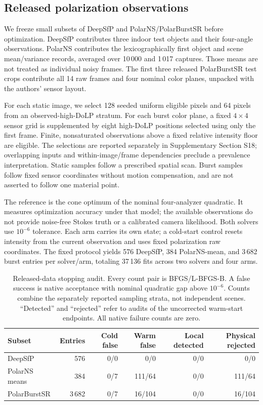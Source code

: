 \subsection{Released polarization observations}
\label{sec:real}
We freeze small subsets of DeepSfP \cite{ba} and PolarNS/PolarBurstSR \cite{polarns} before optimization. DeepSfP contributes three indoor test objects and their four-angle observations. PolarNS contributes the lexicographically first object and scene mean/variance records, averaged over 10\,000 and 1\,017 captures. Those means are not treated as individual noisy frames. The first three released PolarBurstSR test crops contribute all 14 raw frames and four nominal color planes, unpacked with the authors' sensor layout.

For each static image, we select 128 seeded uniform eligible pixels and 64 pixels from an observed-high-DoLP stratum. For each burst color plane, a fixed $4\times4$ sensor grid is supplemented by eight high-DoLP positions selected using only the first frame. Finite, nonsaturated observations above a fixed relative intensity floor are eligible. The selections are reported separately in Supplementary Section S18; overlapping inputs and within-image/frame dependencies preclude a prevalence interpretation. Static samples follow a prescribed spatial scan. Burst samples follow fixed sensor coordinates without motion compensation, and are not asserted to follow one material point.

The reference is the cone optimum of the nominal four-analyzer quadratic. It measures optimization accuracy under that model; the available observations do not provide noise-free Stokes truth or a calibrated camera likelihood. Both solvers use $10^{-6}$ tolerance. Each arm carries its own state; a cold-start control resets intensity from the current observation and uses fixed polarization raw coordinates. The fixed protocol yields 576 DeepSfP, 384 PolarNS-mean, and 3\,682 burst entries per solver/arm, totaling 37\,136 fits across two solvers and four arms.

\begin{table}[!t]
\caption{Released-data stopping audit. Every count pair is BFGS/L-BFGS-B. A false success is native acceptance with nominal quadratic gap above $10^{-6}$. Counts combine the separately reported sampling strata, not independent scenes. ``Detected'' and ``rejected'' refer to audits of the uncorrected warm-start endpoints. All native failure counts are zero.}
\label{tab:realdata}
\centering\small\renewcommand{\arraystretch}{1.15}
\begin{tabularx}{\textwidth}{@{}Xrrrrr@{}}\toprule
Subset & Entries & Cold false & Warm false & Local detected & Physical rejected\\\midrule
DeepSfP & 576 & 0/0 & 0/0 & 0/0 & 0/0\\
PolarNS means & 384 & 0/7 & 111/64 & 0/0 & 111/64\\
PolarBurstSR & 3\,682 & 0/7 & 16/104 & 0/0 & 16/104\\\bottomrule
\end{tabularx}
\end{table}

